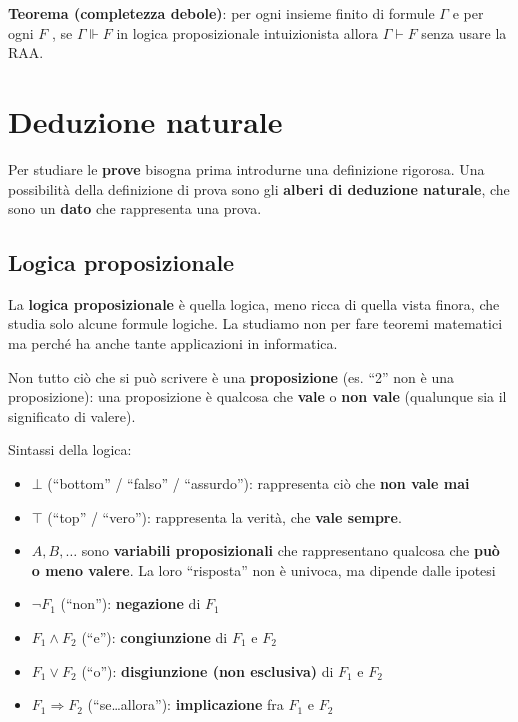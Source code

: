 \documentclass[
  a4paper,
]{article}
\begin{document}
\textbf{Teorema (completezza debole)}: per ogni insieme finito di
formule \(\Gamma\) e per ogni \(F\) , se \(\Gamma \Vdash F\) in logica
proposizionale intuizionista allora \(\Gamma \vdash F\) senza usare la
RAA.

\newpage

\hypertarget{deduzione-naturale}{%
\section{Deduzione naturale}\label{deduzione-naturale}}

Per studiare le \textbf{prove} bisogna prima introdurne una definizione
rigorosa. Una possibilità della definizione di prova sono gli
\textbf{alberi di deduzione naturale}, che sono un \textbf{dato} che
rappresenta una prova.

\hypertarget{logica-proposizionale}{%
\subsection{Logica proposizionale}\label{logica-proposizionale}}

La \textbf{logica proposizionale} è quella logica, meno ricca di quella
vista finora, che studia solo alcune formule logiche. La studiamo non
per fare teoremi matematici ma perché ha anche tante applicazioni in
informatica.

Non tutto ciò che si può scrivere è una \textbf{proposizione} (es. ``2''
non è una proposizione): una proposizione è qualcosa che \textbf{vale} o
\textbf{non vale} (qualunque sia il significato di valere).

Sintassi della logica:

\begin{itemize}
\item
  \(\bot\) (``bottom'' / ``falso'' / ``assurdo''): rappresenta ciò che
  \textbf{non vale mai}
\item
  \(\top\) (``top'' / ``vero''): rappresenta la verità, che \textbf{vale
  sempre}.
\item
  \(A, B, \dots\) sono \textbf{variabili proposizionali} che
  rappresentano qualcosa che \textbf{può o meno valere}. La loro
  ``risposta'' non è univoca, ma dipende dalle ipotesi
\item
  \(\neg F_1\) (``non''): \textbf{negazione} di \(F_1\)
\item
  \(F_1 \land F_2\) (``e''): \textbf{congiunzione} di \(F_1\) e \(F_2\)
\item
  \(F_1 \lor F_2\) (``o''): \textbf{disgiunzione (non esclusiva)} di
  \(F_1\) e \(F_2\)
\item
  \(F_1 \Rightarrow F_2\) (``se\ldots allora''): \textbf{implicazione}
  fra \(F_1\) e \(F_2\)
\end{itemize}
\end{document}
